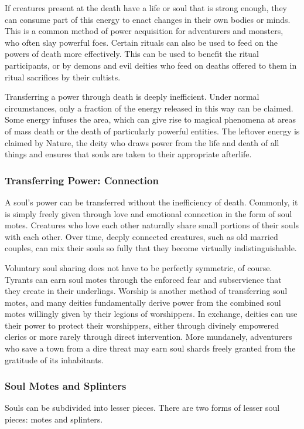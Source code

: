       If creatures present at the death have a life or soul that is strong enough, they can consume part of this energy to enact changes in their own bodies or minds.
      This is a common method of power acquisition for adventurers and monsters, who often slay powerful foes.
      Certain rituals can also be used to feed on the powers of death more effectively.
      This can be used to benefit the ritual participants, or by demons and evil deities who feed on deaths offered to them in ritual sacrifices by their cultists.

      Transferring a power through death is deeply inefficient.
      Under normal circumstances, only a fraction of the energy released in this way can be claimed.
      Some energy infuses the area, which can give rise to magical phenomena at areas of mass death or the death of particularly powerful entities.
      The leftover energy is claimed by Nature, the deity who draws power from the life and death of all things and ensures that souls are taken to their appropriate afterlife.

    \subsubsection{Transferring Power: Connection}
      A soul's power can be transferred without the inefficiency of death.
      Commonly, it is simply freely given through love and emotional connection in the form of soul motes.
      Creatures who love each other naturally share small portions of their souls with each other.
      Over time, deeply connected creatures, such as old married couples, can mix their souls so fully that they become virtually indistinguishable.

      Voluntary soul sharing does not have to be perfectly symmetric, of course.
      Tyrants can earn soul motes through the enforced fear and subservience that they create in their underlings.
      Worship is another method of transferring soul motes, and many deities fundamentally derive power from the combined soul motes willingly given by their legions of worshippers.
      In exchange, deities can use their power to protect their worshippers, either through divinely empowered clerics or more rarely through direct intervention.
      More mundanely, adventurers who save a town from a dire threat may earn soul shards freely granted from the gratitude of its inhabitants.

    \subsubsection{Soul Motes and Splinters}
      Souls can be subdivided into lesser pieces.
      There are two forms of lesser soul pieces: motes and splinters.

